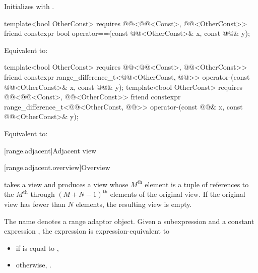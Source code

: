 \begin{itemdescr}
\pnum
\effects
Initializes  with .
\end{itemdescr}

\begin{itemdecl}
template<bool OtherConst>
  requires @@<@@<Const>, @@<OtherConst>>
friend constexpr bool operator==(const @@<OtherConst>& x, const @@& y);
\end{itemdecl}

\begin{itemdescr}
\pnum
\effects
Equivalent to: 
\end{itemdescr}

\begin{itemdecl}
template<bool OtherConst>
  requires @@<@@<Const>, @@<OtherConst>>
friend constexpr range_difference_t<@@<OtherConst, @@>>
  operator-(const @@<OtherConst>& x, const @@& y);
template<bool OtherConst>
  requires @@<@@<Const>, @@<OtherConst>>
friend constexpr range_difference_t<@@<OtherConst, @@>>
  operator-(const @@& x, const @@<OtherConst>& y);
\end{itemdecl}

\begin{itemdescr}
\pnum
\effects
Equivalent to: 
\end{itemdescr}

[range.adjacent]{Adjacent view}

[range.adjacent.overview]{Overview}

\pnum
{}%
 takes a view and
produces a view whose $M^\text{th}$ element is
a tuple of references to
the $M^\text{th}$ through $(M + N - 1)^\text{th}$ elements of
the original view.
If the original view has fewer than $N$ elements, the resulting view is empty.

\pnum
{}%
The name  denotes
a range adaptor object.
Given a subexpression  and a constant expression ,
the expression  is expression-equivalent to
\begin{itemize}
\item
{}
if  is equal to ,
\item
otherwise, .
\end{itemize}

